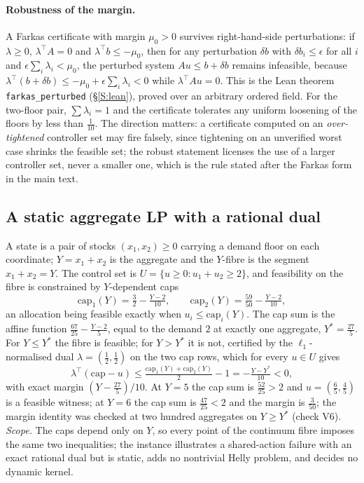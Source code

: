 \documentclass[11pt,a4paper]{article}
\theoremstyle{plain}
\theoremstyle{definition}
\theoremstyle{remark}
\begin{document}
\paragraph{Robustness of the margin.} A Farkas certificate with margin $\mu_0>0$ survives right-hand-side perturbations: if $\lambda\ge0$, $\lambda^\top A=0$ and $\lambda^\top b\le-\mu_0$, then for any perturbation $\delta b$ with $\delta b_i\le\epsilon$ for all $i$ and $\epsilon\sum_i\lambda_i<\mu_0$, the perturbed system $Au\le b+\delta b$ remains infeasible, because $\lambda^\top(b+\delta b)\le-\mu_0+\epsilon\sum_i\lambda_i<0$ while $\lambda^\top Au=0$. This is the Lean theorem \texttt{farkas\_perturbed} (\S\ref{S:lean}), proved over an arbitrary ordered field. For the two-floor pair, $\sum\lambda_i=1$ and the certificate tolerates any uniform loosening of the floors by less than $\tfrac1{10}$. The direction matters: a certificate computed on an \emph{over-tightened} controller set may fire falsely, since tightening on an unverified worst case shrinks the feasible set; the robust statement licenses the use of a larger controller set, never a smaller one, which is the rule stated after the Farkas form in the main text.

\subsection{A static aggregate LP with a rational dual}\label{S:aggregateLP}
A state is a pair of stocks $(x_1,x_2)\ge0$ carrying a demand floor on each coordinate; $Y=x_1+x_2$ is the aggregate and the $Y$-fibre is the segment $x_1+x_2=Y$. The control set is $U=\{u\ge0:u_1+u_2\ge2\}$, and feasibility on the fibre is constrained by $Y$-dependent caps
\[
\mathrm{cap}_1(Y)=\tfrac32-\tfrac{Y-2}{10},\qquad\mathrm{cap}_2(Y)=\tfrac{59}{50}-\tfrac{Y-2}{10},
\]
an allocation being feasible exactly when $u_i\le\mathrm{cap}_i(Y)$. The cap sum is the affine function $\tfrac{67}{25}-\tfrac{Y-2}{5}$, equal to the demand $2$ at exactly one aggregate, $Y^*=\tfrac{27}{5}$. For $Y\le Y^*$ the fibre is feasible; for $Y>Y^*$ it is not, certified by the $\ell_1$-normalised dual $\lambda=(\tfrac12,\tfrac12)$ on the two cap rows, which for every $u\in U$ gives
\[
\lambda^\top(\mathrm{cap}-u)\le\tfrac{\mathrm{cap}_1(Y)+\mathrm{cap}_2(Y)}2-1=-\tfrac{Y-Y^*}{10}<0,
\]
with exact margin $(Y-\tfrac{27}5)/10$. At $Y=5$ the cap sum is $\tfrac{52}{25}>2$ and $u=(\tfrac65,\tfrac45)$ is a feasible witness; at $Y=6$ the cap sum is $\tfrac{47}{25}<2$ and the margin is $\tfrac3{50}$; the margin identity was checked at two hundred aggregates on $Y\ge Y^*$ (check V6). \emph{Scope.} The caps depend only on $Y$, so every point of the continuum fibre imposes the same two inequalities; the instance illustrates a shared-action failure with an exact rational dual but is static, adds no nontrivial Helly problem, and decides no dynamic kernel.
\end{document}
